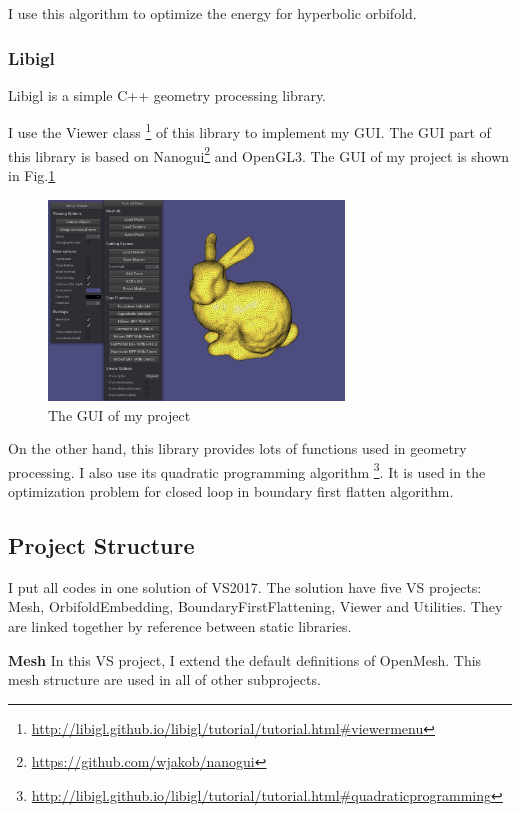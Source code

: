 I use this algorithm to optimize the energy for hyperbolic orbifold.

\subsubsection{Libigl} 
Libigl \cite{libigl} is a simple C++ geometry processing library. 

I use the Viewer class \footnote{\url{http://libigl.github.io/libigl/tutorial/tutorial.html\#viewermenu}} of this library to implement my GUI. The GUI part of this library is based on Nanogui\footnote{\url{https://github.com/wjakob/nanogui}} and OpenGL3. The GUI of my project is shown in Fig.\ref{fig:GUI}

\begin{figure}
\centering
\includegraphics[width=0.7\textwidth]{images/gui}
\caption{The GUI of my project}
\label{fig:GUI}
\end{figure}


On the other hand, this library provides lots of functions used in geometry processing. I also use its quadratic programming algorithm \footnote{\url{http://libigl.github.io/libigl/tutorial/tutorial.html\#quadraticprogramming}}. It is used in the optimization problem for closed loop in boundary first flatten algorithm.

\subsection{Project Structure}
I put all codes in one solution of VS2017. The solution have five VS projects: Mesh, OrbifoldEmbedding, BoundaryFirstFlattening, Viewer and Utilities. They are linked together by reference between static libraries.

\textbf{Mesh}
In this VS project, I extend the default definitions of OpenMesh. This mesh structure are used in all of other subprojects.

